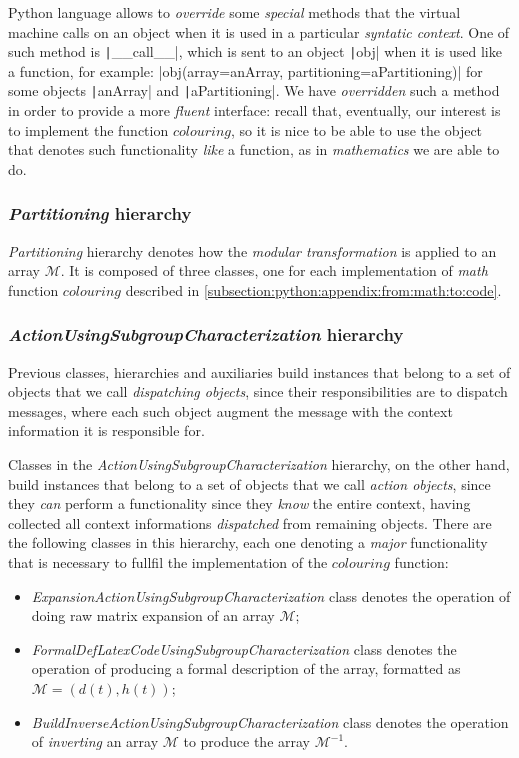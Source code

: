 Python language allows to \emph{override} some \emph{special} methods that the
virtual machine calls on an object when it is used in a particular
\emph{syntatic context}.  One of such method is \texttt|__call__|,
which is sent to an object \texttt|obj| when it is used like a
function, for example: |obj(array=anArray,
partitioning=aPartitioning)| for some objects \texttt|anArray| and
\texttt|aPartitioning|. We have \emph{overridden} such a method in
order to provide a more \emph{fluent} interface: recall that, eventually, our
interest is to implement the function $colouring$, so it is nice to be able to
use the object that denotes such functionality \emph{like} a function, as in
\emph{mathematics} we are able to do. 

\subsubsection{\emph{Partitioning} hierarchy}

\emph{Partitioning} hierarchy denotes how the \emph{modular transformation} is
applied to an array $\mathcal{M}$. It is composed of three classes, one for
each implementation of \emph{math} function $colouring$ described in
\autoref{subsection:python:appendix:from:math:to:code}.

\subsubsection{\emph{ActionUsingSubgroupCharacterization} hierarchy}

Previous classes, hierarchies and auxiliaries build instances that belong to a
set of objects that we call \emph{dispatching objects}, since their responsibilities
are to dispatch messages, where each such object augment the message with the
context information it is responsible for. 

Classes in the \emph{ActionUsingSubgroupCharacterization} hierarchy, on the other hand,
build instances that belong to a set of objects that we call \emph{action objects},
since they \emph{can} perform a functionality since they \emph{know} the entire context,
having collected all context informations \emph{dispatched} from remaining objects.
There are the following classes in this hierarchy, each one denoting a \emph{major}
functionality that is necessary to fullfil the implementation of the $colouring$ 
function:
\begin{itemize}
    \item \emph{ExpansionActionUsingSubgroupCharacterization} class denotes
        the operation of doing raw matrix expansion of an array $\mathcal{M}$; 
    \item \emph{FormalDefLatexCodeUsingSubgroupCharacterization} class denotes
        the operation of producing a formal description of the array, 
        formatted as $\mathcal{M}=(d(t),h(t))$;
    \item \emph{BuildInverseActionUsingSubgroupCharacterization} class denotes
        the operation of \emph{inverting} an array $\mathcal{M}$ to produce 
        the array $\mathcal{M}^{-1}$.
\end{itemize}

